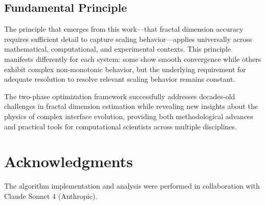 \documentclass[preprint,12pt]{elsarticle}
\begin{document}
\subsection{Fundamental Principle}

The principle that emerges from this work—that fractal dimension accuracy requires sufficient detail to capture scaling behavior—applies universally across mathematical, computational, and experimental contexts. This principle manifests differently for each system: some show smooth convergence while others exhibit complex non-monotonic behavior, but the underlying requirement for adequate resolution to resolve relevant scaling behavior remains constant.

The two-phase optimization framework successfully addresses decades-old challenges in fractal dimension estimation while revealing new insights about the physics of complex interface evolution, providing both methodological advances and practical tools for computational scientists across multiple disciplines.

\section*{Acknowledgments}
The algorithm implementation and analysis were performed in collaboration with Claude Sonnet 4 (Anthropic).



\end{document}

